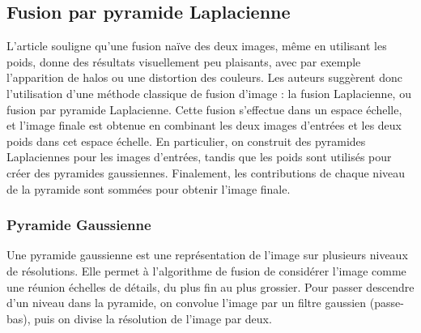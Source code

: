 \documentclass[twoside]{article}
\begin{document}
\subsection{Fusion par pyramide Laplacienne}
L'article souligne qu'une fusion naïve des deux images, même en utilisant les poids, donne des résultats visuellement peu plaisants, avec par exemple l'apparition de halos ou une distortion des couleurs. Les auteurs suggèrent donc l'utilisation d'une méthode classique de fusion d'image : la fusion Laplacienne, ou fusion par pyramide Laplacienne. Cette fusion s'effectue dans un espace échelle, et l'image finale est obtenue en combinant les deux images d'entrées et les deux poids dans cet espace échelle. En particulier, on construit des pyramides Laplaciennes pour les images d'entrées, tandis que les poids sont utilisés pour créer des pyramides gaussiennes. Finalement, les contributions de chaque niveau de la pyramide sont sommées pour obtenir l'image finale.\\

\subsubsection{Pyramide Gaussienne}
Une pyramide gaussienne est une représentation de l'image sur plusieurs niveaux de résolutions. Elle permet à l'algorithme de fusion de considérer l'image comme une réunion échelles de détails, du plus fin au plus grossier. Pour passer descendre d'un niveau dans la pyramide, on convolue l'image par un filtre gaussien (passe-bas), puis on divise la résolution de l'image par deux.
\end{document}
